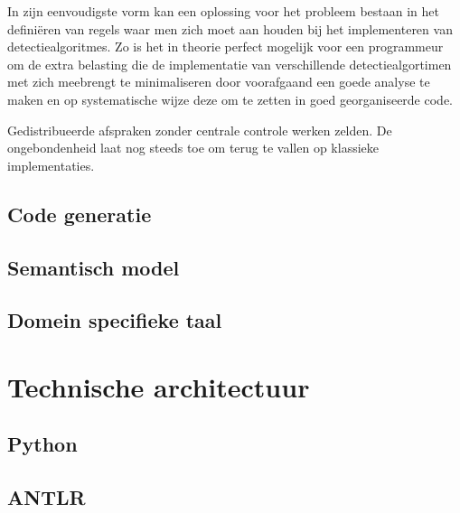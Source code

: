 In zijn eenvoudigste vorm kan een oplossing voor het probleem bestaan in het
defini\"eren van regels waar men zich moet aan houden bij het implementeren van
detectiealgoritmes. Zo is het in theorie perfect mogelijk voor een programmeur
om de extra belasting die de implementatie van verschillende detectiealgortimen
met zich meebrengt te minimaliseren door voorafgaand een goede analyse te maken
en op systematische wijze deze om te zetten in goed georganiseerde code.

Gedistribueerde afspraken zonder centrale controle werken zelden. De
ongebondenheid laat nog steeds toe om terug te vallen op klassieke
implementaties.

\subsection{Code generatie}

\TODO

\subsection{Semantisch model}

\TODO

\citep{fowler2010domain}

\subsection{Domein specifieke taal}



\section{Technische architectuur}
\label{section:techarch}

\TODO

\subsection{Python}

\TODO

\subsection{ANTLR}

\TODO

